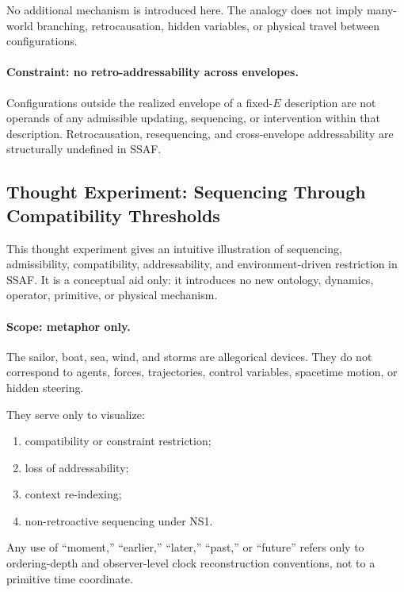 \documentclass[aps,prx,onecolumn,11pt]{revtex4-2}
\theoremstyle{plain}
\theoremstyle{definition}
\theoremstyle{remark}
\begin{document}
No additional mechanism is introduced here. The analogy does not imply
many-world branching, retrocausation, hidden variables, or physical
travel between configurations.

\paragraph{Constraint: no retro-addressability across envelopes.}

Configurations outside the realized envelope of a fixed-\(E\)
description are not operands of any admissible updating, sequencing, or
intervention within that description. Retrocausation, resequencing, and
cross-envelope addressability are structurally undefined in SSAF.

\subsection{Thought Experiment: Sequencing Through Compatibility Thresholds}
\label{appC:thought_sailor_sequencing}

This thought experiment gives an intuitive illustration of sequencing,
admissibility, compatibility, addressability, and environment-driven
restriction in SSAF. It is a conceptual aid only: it introduces no new
ontology, dynamics, operator, primitive, or physical mechanism.

\paragraph{Scope: metaphor only.}

The sailor, boat, sea, wind, and storms are allegorical devices. They
do not correspond to agents, forces, trajectories, control variables,
spacetime motion, or hidden steering.

They serve only to visualize:

\begin{enumerate}[label=(\roman*), leftmargin=2.2em]
\item compatibility or constraint restriction;
\item loss of addressability;
\item context re-indexing;
\item non-retroactive sequencing under NS1.
\end{enumerate}

Any use of ``moment,'' ``earlier,'' ``later,'' ``past,'' or ``future''
refers only to ordering-depth and observer-level clock reconstruction
conventions, not to a primitive time coordinate.
\end{document}
